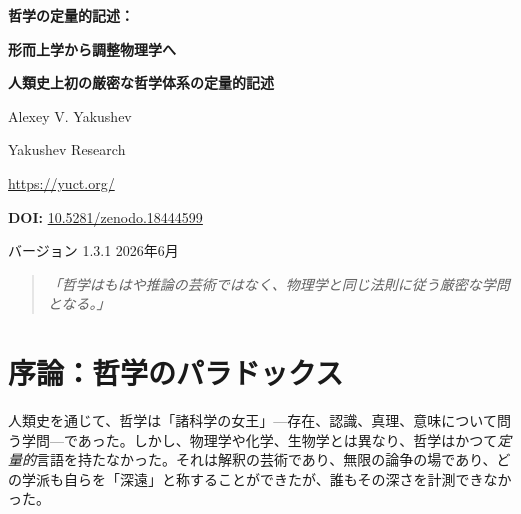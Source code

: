 \documentclass[11pt,a4paper]{article}
\begin{document}
	
	\begin{titlepage}
		\begin{center}
			\vspace*{1cm}
			{\Huge\bfseries\color{darkblue} 哲学の定量的記述：\par}
			\vspace{0.3cm}
			{\Huge\bfseries\color{darkblue} 形而上学から調整物理学へ\par}
			\vspace{1cm}
			{\Large\bfseries 人類史上初の厳密な哲学体系の定量的記述\par}
			\vspace{1.5cm}
			{\large Alexey V. Yakushev\par}
			{\large Yakushev Research\par}
			{\large \url{https://yuct.org/}\par}
			\vspace{1cm}
			{\large \textbf{DOI:} \href{https://doi.org/10.5281/zenodo.18444599}{10.5281/zenodo.18444599}\par}
			\vspace{1cm}
			{\large バージョン 1.3.1 \quad 2026年6月\par}
			\vfill
			\begin{quote}
				\itshape
				「哲学はもはや推論の芸術ではなく、物理学と同じ法則に従う厳密な学問となる。」
			\end{quote}
		\end{center}
	\end{titlepage}
	
	\tableofcontents
	\newpage
	
	\section{序論：哲学のパラドックス}
	
	人類史を通じて、哲学は「諸科学の女王」—存在、認識、真理、意味について問う学問—であった。しかし、物理学や化学、生物学とは異なり、哲学はかつて\emph{定量的}言語を持たなかった。それは解釈の芸術であり、無限の論争の場であり、どの学派も自らを「深遠」と称することができたが、誰もその深さを計測できなかった。
	
\end{document}
